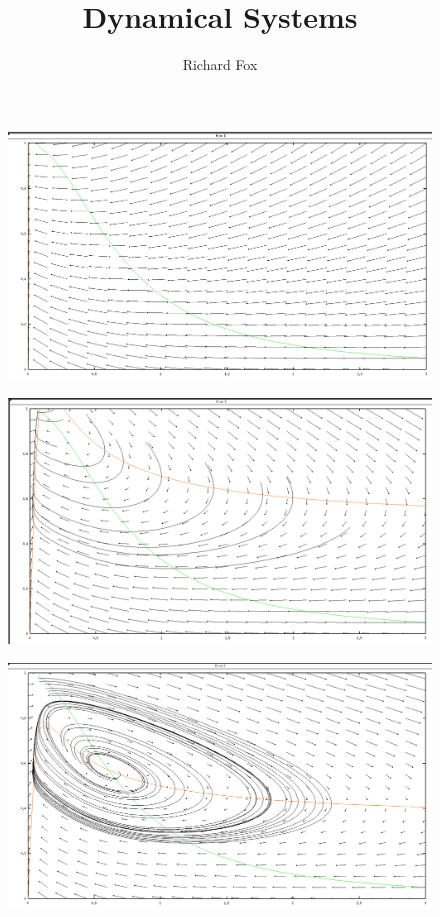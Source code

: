 \documentclass[a4paper,12pt,notitlepage]{article}
\title{Dynamical Systems}
\author{Richard Fox}
\date{}
\begin{document}
\begin{figure}[h]
    \centering
        \centering
        \includegraphics[width=\textwidth]{mu01.png} 
\end{figure}

\begin{figure}[h]
        \centering
        \includegraphics[width=\textwidth]{mu3.png} 
\end{figure}

\begin{figure}[h]
    \centering
        \centering
        \includegraphics[width=\textwidth]{mu5.png} 
\end{figure}
\end{document}

